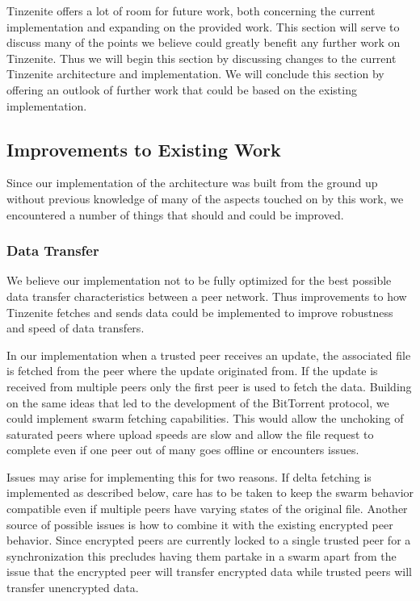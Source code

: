 Tinzenite offers a lot of room for future work, both concerning the current implementation and expanding on the provided work.
This section will serve to discuss many of the points we believe could greatly benefit any further work on Tinzenite.
Thus we will begin this section by discussing changes to the current Tinzenite architecture and implementation.
We will conclude this section by offering an outlook of further work that could be based on the existing implementation.

\subsection{Improvements to Existing Work}
\label{sub:Improvements to Existing Work}

Since our implementation of the architecture was built from the ground up without previous knowledge of many of the aspects touched on by this work, we encountered a number of things that should and could be improved.

\subsubsection{Data Transfer}
\label{subs:Data Transfer}

We believe our implementation not to be fully optimized for the best possible data transfer characteristics between a peer network.
Thus improvements to how Tinzenite fetches and sends data could be implemented to improve robustness and speed of data transfers.

In our implementation when a trusted peer receives an update, the associated file is fetched from the peer where the update originated from.
If the update is received from multiple peers only the first peer is used to fetch the data.
Building on the same ideas that led to the development of the BitTorrent protocol, we could implement swarm fetching capabilities.
This would allow the unchoking of saturated peers where upload speeds are slow and allow the file request to complete even if one peer out of many goes offline or encounters issues.

Issues may arise for implementing this for two reasons.
If delta fetching is implemented as described below, care has to be taken to keep the swarm behavior compatible even if multiple peers have varying states of the original file.
Another source of possible issues is how to combine it with the existing encrypted peer behavior.
Since encrypted peers are currently locked to a single trusted peer for a synchronization this precludes having them partake in a swarm apart from the issue that the encrypted peer will transfer encrypted data while trusted peers will transfer unencrypted data.

